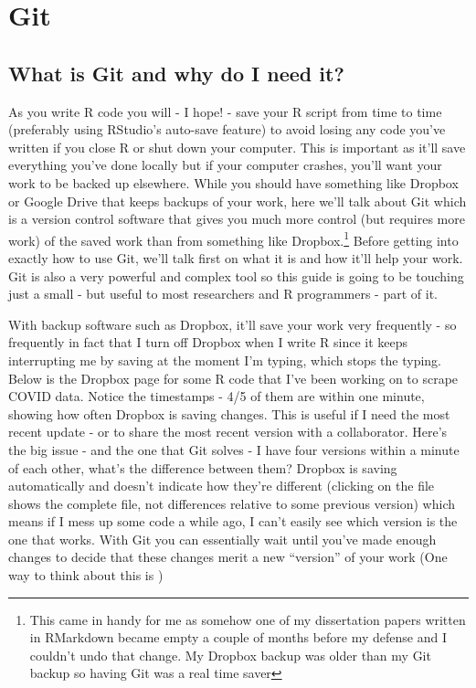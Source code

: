 \documentclass[
  12pt,
]{book}
\begin{document}
\hypertarget{git}{%
\chapter{Git}\label{git}}

\hypertarget{what-is-git-and-why-do-i-need-it}{%
\section{What is Git and why do I need it?}\label{what-is-git-and-why-do-i-need-it}}

As you write R code you will - I hope! - save your R script from time to time (preferably using RStudio's auto-save feature) to avoid losing any code you've written if you close R or shut down your computer. This is important as it'll save everything you've done locally but if your computer crashes, you'll want your work to be backed up elsewhere. While you should have something like Dropbox or Google Drive that keeps backups of your work, here we'll talk about Git which is a version control software that gives you much more control (but requires more work) of the saved work than from something like Dropbox.\footnote{This came in handy for me as somehow one of my dissertation papers written in RMarkdown became empty a couple of months before my defense and I couldn't undo that change. My Dropbox backup was older than my Git backup so having Git was a real time saver} Before getting into exactly how to use Git, we'll talk first on what it is and how it'll help your work. Git is also a very powerful and complex tool so this guide is going to be touching just a small - but useful to most researchers and R programmers - part of it.

With backup software such as Dropbox, it'll save your work very frequently - so frequently in fact that I turn off Dropbox when I write R since it keeps interrupting me by saving at the moment I'm typing, which stops the typing. Below is the Dropbox page for some R code that I've been working on to scrape COVID data. Notice the timestamps - 4/5 of them are within one minute, showing how often Dropbox is saving changes. This is useful if I need the most recent update - or to share the most recent version with a collaborator. Here's the big issue - and the one that Git solves - I have four versions within a minute of each other, what's the difference between them? Dropbox is saving automatically and doesn't indicate how they're different (clicking on the file shows the complete file, not differences relative to some previous version) which means if I mess up some code a while ago, I can't easily see which version is the one that works. With Git you can essentially wait until you've made enough changes to decide that these changes merit a new ``version'' of your work (One way to think about this is )
\end{document}
